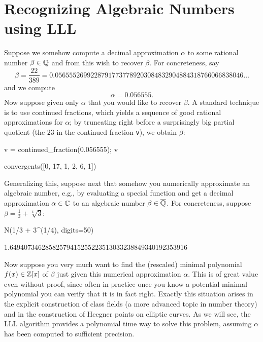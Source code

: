 \section{Recognizing Algebraic Numbers using LLL}\label{sec:LLL}

Suppose we somehow compute a decimal approximation $\alpha$
to some rational number $\beta \in \mathbb{Q}$ and from this wish
to recover $\beta$.  For concreteness, say
$$
	\beta = \frac{22}{389} = 
	0.05655526992287917737789203
	084832904884318766066838046
	\ldots
$$
and we compute
$$
	\alpha = 0.056555.
$$
Now suppose given only $\alpha$ that you would like to recover
$\beta$.  A standard technique is to use continued fractions, which
yields a sequence of good rational approximations
for $\alpha$; by truncating right before a surprisingly big
partial quotient (the $23$ in the continued fraction {\tt v}),
we obtain $\beta$:
\begin{sagecode}
\begin{sagecell}
v = continued_fraction(0.056555); v
\end{sagecell}
\begin{sageout}
[0, 17, 1, 2, 6, 1, 23, 1, 1, 1, 1, 1, 2]
\end{sageout}
\begin{sagecell}
convergents([0, 17, 1, 2, 6, 1])
\end{sagecell}
\begin{sageout}
[0, 1/17, 1/18, 3/53, 19/336, 22/389]
\end{sageout}
\end{sagecode}

Generalizing this, suppose next that somehow you numerically approximate
an algebraic number, e.g., by evaluating a special
function and get a decimal approximation $\alpha \in \mathbb{C}$
to an algebraic number $\beta \in \overline{\mathbb{Q}}$.  For concreteness,
suppose $\beta = \frac{1}{3} + \sqrt[4]{3}$:
\begin{sagecode}
\begin{sagecell}
N(1/3 + 3^(1/4), digits=50)
\end{sagecell}
\begin{sageout}
1.64940734628582579415255223513033238849340192353916
\end{sageout}
\end{sagecode}
Now suppose you very much want to find the (rescaled)
minimal polynomial $f(x) \in \mathbb{Z}[x]$
of $\beta$ just given this numerical approximation $\alpha$.
This is of great value even without proof, since often in practice
once you know a potential minimal polynomial you can
verify that it is in fact right.  Exactly this situation
arises in the explicit construction of class fields (a
more advanced topic in number theory) and in the construction
of Heegner points on elliptic curves.   As we will see, the
LLL algorithm provides a polynomial time way to solve this
problem, assuming $\alpha$ has been computed to
sufficient precision.

